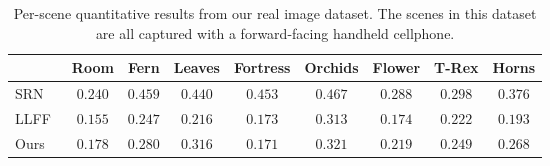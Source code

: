 \begin{table}[t]
{\begin{tabular}{l|cccccccc}
& Room & Fern & Leaves & Fortress & Orchids & Flower & T-Rex & Horns \\
\hline
SRN~\cite{srn}            & $0.240$ & $0.459$ & $0.440$ & $0.453$ & $0.467$ & $0.288$ & $0.298$ & $0.376$ \\
LLFF~\cite{mildenhall19}  & $\mathbf{0.155}$ & $\mathbf{0.247}$ & $\mathbf{0.216}$ & $0.173$ & $\mathbf{0.313}$ & $\mathbf{0.174}$ & $\mathbf{0.222}$ & $\mathbf{0.193}$ \\
Ours                      & $0.178$ & $0.280$ & $0.316$ & $\mathbf{0.171}$ & $0.321$ & $0.219$ & $0.249$ & $0.268$ \\
\hline
\end{tabular}
} \vspace{2mm}
\caption{Per-scene quantitative results from our real image dataset. The scenes in this dataset are all captured with a forward-facing handheld cellphone.
}
\label{table:suppresults3}  
\end{table}
\setlength{\tabcolsep}{1.4pt}




